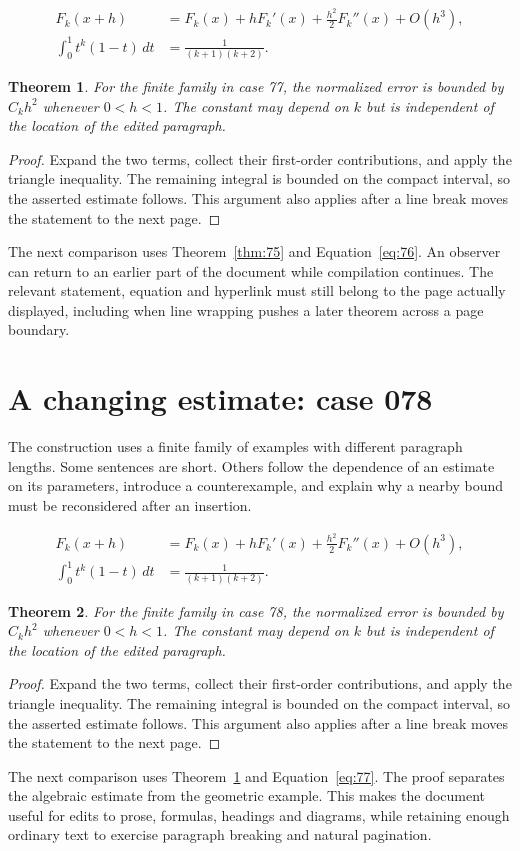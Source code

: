 \documentclass[a4paper,10pt]{article}
\newtheorem{theorem}{Theorem}[section]
\begin{document}
\lipsum[19-20]
\begin{align}\label{eq:76}
 F_k(x+h)&=F_k(x)+hF_k'(x)+\frac{h^2}{2}F_k''(x)+O(h^3),\\
 \int_0^1 t^k(1-t)\,dt&=\frac{1}{(k+1)(k+2)}.
\end{align}
\begin{theorem}\label{thm:76}
For the finite family in case 77, the normalized error is bounded by $C_k h^2$ whenever $0<h<1$. The constant may depend on $k$ but is independent of the location of the edited paragraph.
\end{theorem}
\begin{proof}
Expand the two terms, collect their first-order contributions, and apply the
triangle inequality. The remaining integral is bounded on the compact interval,
so the asserted estimate follows. This argument also applies after a line break
moves the statement to the next page.
\end{proof}
The next comparison uses Theorem~\ref{thm:75} and Equation~\ref{eq:76}. An observer can return to an earlier part of the document while compilation continues. The relevant statement, equation and hyperlink must still belong to the page actually displayed, including when line wrapping pushes a later theorem across a page boundary.

\lipsum[8]

\section{A changing estimate: case 078}\label{unit:77}
The construction uses a finite family of examples with different paragraph lengths. Some sentences are short. Others follow the dependence of an estimate on its parameters, introduce a counterexample, and explain why a nearby bound must be reconsidered after an insertion.

\lipsum[22-23]
\begin{align}\label{eq:77}
 F_k(x+h)&=F_k(x)+hF_k'(x)+\frac{h^2}{2}F_k''(x)+O(h^3),\\
 \int_0^1 t^k(1-t)\,dt&=\frac{1}{(k+1)(k+2)}.
\end{align}
\begin{theorem}\label{thm:77}
For the finite family in case 78, the normalized error is bounded by $C_k h^2$ whenever $0<h<1$. The constant may depend on $k$ but is independent of the location of the edited paragraph.
\end{theorem}
\begin{proof}
Expand the two terms, collect their first-order contributions, and apply the
triangle inequality. The remaining integral is bounded on the compact interval,
so the asserted estimate follows. This argument also applies after a line break
moves the statement to the next page.
\end{proof}
The next comparison uses Theorem~\ref{thm:76} and Equation~\ref{eq:77}. The proof separates the algebraic estimate from the geometric example. This makes the document useful for edits to prose, formulas, headings and diagrams, while retaining enough ordinary text to exercise paragraph breaking and natural pagination.
\end{document}
